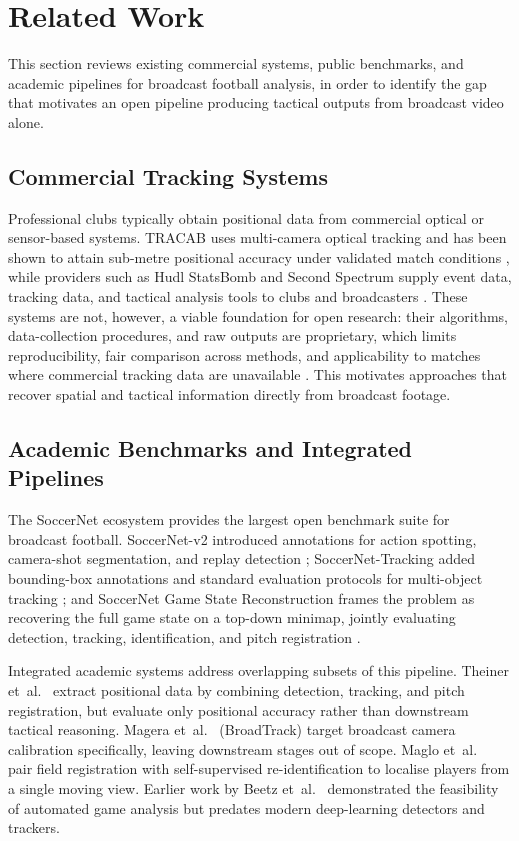 \section{Related Work}
\label{sec:related_work}

This section reviews existing commercial systems, public 
benchmarks, and academic pipelines for broadcast football 
analysis, in order to identify the gap that motivates an 
open pipeline producing tactical outputs from broadcast 
video alone.

\subsection{Commercial Tracking Systems}

Professional clubs typically obtain positional data from 
commercial optical or sensor-based systems. TRACAB uses 
multi-camera optical tracking and has been shown to attain 
sub-metre positional accuracy under validated match conditions 
\cite{Linke2020}, while providers such as Hudl StatsBomb and 
Second Spectrum supply event data, tracking data, and tactical 
analysis tools to clubs and broadcasters \cite{Davis2024}. 
These systems are not, however, a viable foundation for open 
research: their algorithms, data-collection procedures, and 
raw outputs are proprietary, which limits reproducibility, 
fair comparison across methods, and applicability to matches 
where commercial tracking data are unavailable 
\cite{Ellens2022, Davis2024}. This motivates approaches that 
recover spatial and tactical information directly from 
broadcast footage.

\subsection{Academic Benchmarks and Integrated Pipelines}

The SoccerNet ecosystem provides the largest open benchmark 
suite for broadcast football. SoccerNet-v2 introduced 
annotations for action spotting, camera-shot segmentation, 
and replay detection \cite{Deliege2021}; SoccerNet-Tracking 
added bounding-box annotations and standard evaluation 
protocols for multi-object tracking \cite{Cioppa2022}; and 
SoccerNet Game State Reconstruction frames the problem as 
recovering the full game state on a top-down minimap, jointly 
evaluating detection, tracking, identification, and pitch 
registration \cite{Somers2024}.

Integrated academic systems address overlapping subsets of 
this pipeline. Theiner et~al.\ \cite{Theiner2022} extract 
positional data by combining detection, tracking, and pitch 
registration, but evaluate only positional accuracy rather 
than downstream tactical reasoning. Magera et~al.\ 
\cite{Magera2025} (BroadTrack) target broadcast camera 
calibration specifically, leaving downstream stages out of 
scope. Maglo et~al.\ \cite{Maglo2023} pair field registration 
with self-supervised re-identification to localise players 
from a single moving view. Earlier work by Beetz et~al.\ 
\cite{Beetz2007} demonstrated the feasibility of automated 
game analysis but predates modern deep-learning detectors 
and trackers.

